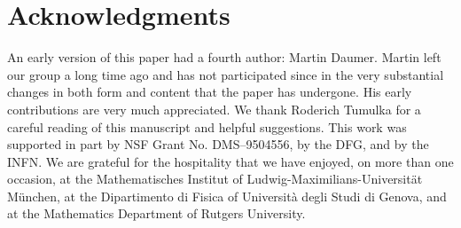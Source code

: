 \documentclass[12pt]{article}
\begin{document}
\section*{Acknowledgments}
An early version of this paper had a fourth author: Martin Daumer.
Martin left our group a long time ago and has not participated since
in the very substantial changes in both form and content that the
paper has undergone. His early contributions are very much
appreciated. We thank Roderich Tumulka for a careful reading of this
manuscript and helpful suggestions. This work was supported in part by
NSF Grant No. DMS--9504556, by the DFG, and by the INFN.  We are
grateful for the hospitality that we have enjoyed, on more than one
occasion, at the Mathematisches Institut of
Ludwig-Maximilians-Universit\"at M\"unchen, at the Dipartimento di
Fisica of Universit\`a degli Studi di Genova, and at the Mathematics
Department of Rutgers University.


\end{document}
